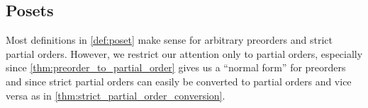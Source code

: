 \subsection{Posets}\label{subsec:posets}

\begin{remark}\label{remark:only_partial_orders}
  Most definitions in \cref{def:poset} make sense for arbitrary preorders and strict partial orders. However, we restrict our attention only to partial orders, especially since \cref{thm:preorder_to_partial_order} gives us a \enquote{normal form} for preorders and since strict partial orders can easily be converted to partial orders and vice versa as in \cref{thm:strict_partial_order_conversion}.
\end{remark}

